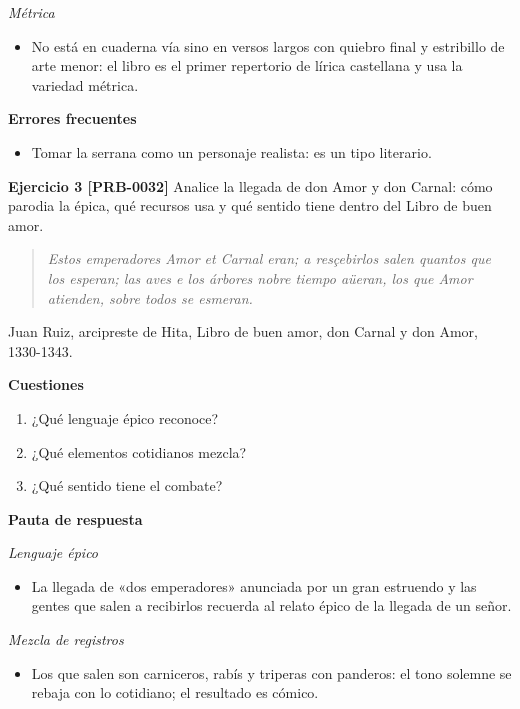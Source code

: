 \documentclass{book}
\begin{document}
\noindent\textit{Métrica}
\begin{itemize}
\item No está en cuaderna vía sino en versos largos con quiebro final y estribillo de arte menor: el libro es el primer repertorio de lírica castellana y usa la variedad métrica.
\end{itemize}

\noindent\textbf{Errores frecuentes}
\begin{itemize}
\item Tomar la serrana como un personaje realista: es un tipo literario.
\end{itemize}

\noindent\textbf{Ejercicio 3 [PRB-0032]}
Analice la llegada de don Amor y don Carnal: cómo parodia la épica, qué recursos usa y qué sentido tiene dentro del Libro de buen amor.


\begin{quote}
\itshape Estos emperadores Amor et Carnal eran; a resçebirlos salen quantos que los esperan; las aves e los árbores nobre tiempo aüeran, los que Amor atienden, sobre todos se esmeran.
\end{quote}
{\noindent\footnotesize Juan Ruiz, arcipreste de Hita, Libro de buen amor, don Carnal y don Amor, 1330-1343.\par}

\noindent\textbf{Cuestiones}
\begin{enumerate}
\item ¿Qué lenguaje épico reconoce?
\item ¿Qué elementos cotidianos mezcla?
\item ¿Qué sentido tiene el combate?
\end{enumerate}

\noindent\textbf{Pauta de respuesta}

\noindent\textit{Lenguaje épico}
\begin{itemize}
\item La llegada de «dos emperadores» anunciada por un gran estruendo y las gentes que salen a recibirlos recuerda al relato épico de la llegada de un señor.
\end{itemize}

\noindent\textit{Mezcla de registros}
\begin{itemize}
\item Los que salen son carniceros, rabís y triperas con panderos: el tono solemne se rebaja con lo cotidiano; el resultado es cómico.
\end{itemize}
\end{document}
